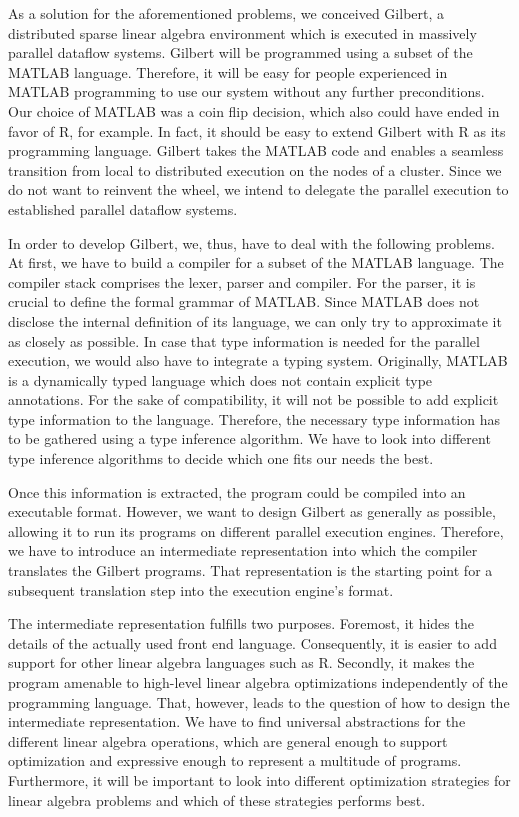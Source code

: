 As a solution for the aforementioned problems, we conceived Gilbert, a distributed sparse linear algebra environment which is executed in massively parallel dataflow systems.
Gilbert will be programmed using a subset of the MATLAB language.
Therefore, it will be easy for people experienced in MATLAB programming to use our system without any further preconditions.
Our choice of MATLAB was a coin flip decision, which also could have ended in favor of R, for example.
In fact, it should be easy to extend Gilbert with R as its programming language.
Gilbert takes the MATLAB code and enables a seamless transition from local to distributed execution on the nodes of a cluster.
Since we do not want to reinvent the wheel, we intend to delegate the parallel execution to established parallel dataflow systems.

In order to develop Gilbert, we, thus, have to deal with the following problems.
At first, we have to build a compiler for a subset of the MATLAB language.
The compiler stack comprises the lexer, parser and compiler.
For the parser, it is crucial to define the formal grammar of MATLAB.
Since MATLAB does not disclose the internal definition of its language, we can only try to approximate it as closely as possible.
In case that type information is needed for the parallel execution, we would also have to integrate a typing system.
Originally, MATLAB is a dynamically typed language which does not contain explicit type annotations.
For the sake of compatibility, it will not be possible to add explicit type information to the language.
Therefore, the necessary type information has to be gathered using a type inference algorithm.
We have to look into different type inference algorithms to decide which one fits our needs the best.

Once this information is extracted, the program could be compiled into an executable format.
However, we want to design Gilbert as generally as possible, allowing it to run its programs on different parallel execution engines.
Therefore, we have to introduce an intermediate representation into which the compiler translates the Gilbert programs.
That representation is the starting point for a subsequent translation step into the execution engine's format.

The intermediate representation fulfills two purposes.
Foremost, it hides the details of the actually used front end language.
Consequently, it is easier to add support for other linear algebra languages such as R.
Secondly, it makes the program amenable to high-level linear algebra optimizations independently of the programming language.
That, however, leads to the question of how to design the intermediate representation.
We have to find universal abstractions for the different linear algebra operations, which are general enough to support optimization and expressive enough to represent a multitude of programs.
Furthermore, it will be important to look into different optimization strategies for linear algebra problems and which of these strategies performs best.

